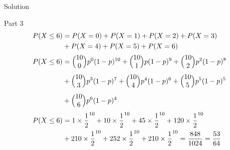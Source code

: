 \documentclass{beamer}
\makeatletter
\newcommand{\mybinom}[2]{\Bigl(\begin{array}{@{}c@{}}#1\\#2\end{array}\Bigr)}
\makeatother
\begin{document}
\begin{frame}{Solution}
    \begin{block}{Part 3}
        \begin{align}
            P(X \leq 6) &= P(X=0)+P(X=1)+P(X=2)+P(X=3)\\ &+P(X=4)+P(X=5)+P(X=6) \\
            P(X \leq 6) &= \mybinom{10}{0}p^0(1-p)^{10}+\mybinom{10}{1}p(1-p)^9+\mybinom{10}{2}p^2(1-p)^8 \\ &+\mybinom{10}{3}p^3(1-p)^7+\mybinom{10}{4}p^4(1-p)^6+\mybinom{10}{5}p^5(1-p)^5\\ &+\mybinom{10}{6}p^6(1-p)^4\\
            P(X \leq 6) &= 1\times\frac{1}{2}^{10}+10\times\frac{1}{2}^{10}+45\times\frac{1}{2}^{10}+120\times\frac{1}{2}^{10}\\ &+210\times\frac{1}{2}^{10}+252\times\frac{1}{2}^{10}+210\times\frac{1}{2}^{10}= \frac{848}{1024} = \frac{53}{64}
        \end{align}
    \end{block}
\end{frame}
\end{document}
